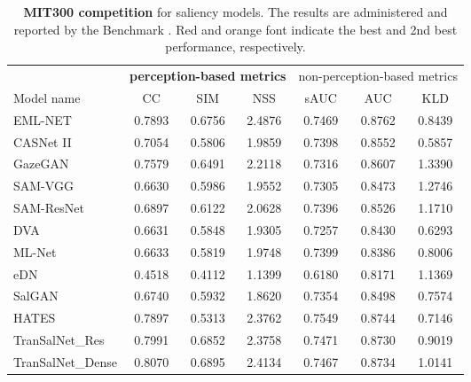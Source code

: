 \documentclass{article}
\begin{document}
\begin{table}[]
\caption{\textbf{MIT300 competition} for saliency models. The results are administered and reported by the Benchmark \cite{benchmark}. {\color{red}Red} and {\color{orange}orange} font indicate the best and 2nd best performance, respectively.}\label{tb:perf_comp_mit300}
\centering
\renewcommand{\arraystretch}{1.2}
\begin{adjustbox}{width=0.48\textwidth}
\begin{tabular}{l|c c c c c c }
\toprule

& \multicolumn{3}{c|}{\textbf{perception-based metrics}}              
& \multicolumn{3}{c}{non-perception-based metrics} \\
Model name & CC  & SIM  & \multicolumn{1}{c|}{NSS } & sAUC  &  AUC  &  KLD  \\ \midrule \midrule 

EML-NET~\cite{EML-NET}& 0.7893 & 0.6756 & \multicolumn{1}{c|}{{\color{red}2.4876}} & 0.7469 & {\color{red}0.8762} & 0.8439 \\
CASNet II~\cite{CASNET2}& 0.7054 &0.5806 & \multicolumn{1}{c|}{1.9859}& 0.7398 & 0.8552 &{\color{red}0.5857} \\
GazeGAN~\cite{GAZEGAN}& 0.7579 & 0.6491 & \multicolumn{1}{c|}{2.2118} & 0.7316 & 0.8607 &1.3390\\
SAM-VGG~\cite{SAM_Cornia}& 0.6630 & 0.5986 &\multicolumn{1}{c|}{1.9552}  &0.7305 &0.8473 &1.2746  \\
SAM-ResNet~\cite{SAM_Cornia}& 0.6897  &0.6122 & \multicolumn{1}{c|}{2.0628}  & 0.7396 & 0.8526 & 1.1710 \\
DVA~\cite{DVA_Wang}& 0.6631 & 0.5848& \multicolumn{1}{c|}{1.9305}& 0.7257 &0.8430 & {\color{orange}0.6293}\\
ML-Net~\cite{ML-Net}&0.6633 & 0.5819 &\multicolumn{1}{c|}{1.9748} & 0.7399 & 0.8386 & 0.8006 \\
eDN~\cite{eDN}&0.4518 &0.4112 &\multicolumn{1}{c|}{1.1399} & 0.6180 &0.8171 & 1.1369 \\
SalGAN~\cite{SalGAN}&0.6740 & 0.5932 &\multicolumn{1}{c|}{1.8620} & 0.7354 & 0.8498 &0.7574\\
HATES&0.7897 & 0.5313 &\multicolumn{1}{c|}{2.3762} & {\color{red}0.7549} & {\color{orange}0.8744} &0.7146\\
\midrule
TranSalNet\_Res & {\color{orange}0.7991} & {\color{orange}0.6852} & \multicolumn{1}{c|}{2.3758} & {\color{orange}0.7471} &0.8730 & 0.9019 \\
TranSalNet\_Dense & {\color{red}0.8070} & {\color{red}0.6895} & \multicolumn{1}{c|}{{\color{orange}2.4134}} & 0.7467 &0.8734 & 1.0141 \\
\bottomrule
\end{tabular}
\end{adjustbox}
\end{table}
\end{document}
